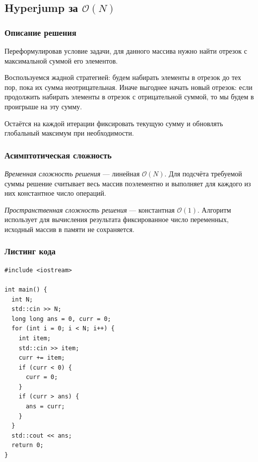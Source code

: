 \subsection{Hyperjump за \( \mathcal{O}(N) \)}

\subsubsection{Описание решения}

Переформулировав условие задачи, для данного массива нужно найти отрезок с максимальной суммой его элементов.

Воспользуемся жадной стратегией: будем набирать элементы в отрезок до тех пор, пока их сумма неотрицательная. Иначе выгоднее начать новый отрезок: если продолжить набирать элементы в отрезок с отрицательной суммой, то мы будем в проигрыше на эту сумму.

Остаётся на каждой итерации фиксировать текущую сумму и обновлять глобальный максимум при необходимости.

\subsubsection{Асимптотическая сложность}

\textit{Временная сложность решения} --- линейная \( \mathcal{O}(N) \). Для подсчёта требуемой суммы решение считывает весь массив поэлементно и выполняет для каждого из них константное число операций.

\textit{Пространственная сложность решения} --- константная \( \mathcal{O}(1) \). Алгоритм использует для вычисления результата фиксированное число переменных, исходный массив в памяти не сохраняется.

\subsubsection{Листинг кода}

\begin{lstlisting}
#include <iostream>

int main() {
  int N;
  std::cin >> N;
  long long ans = 0, curr = 0;
  for (int i = 0; i < N; i++) {
    int item;
    std::cin >> item;
    curr += item;
    if (curr < 0) {
      curr = 0;
    }
    if (curr > ans) {
      ans = curr;
    }
  }
  std::cout << ans;
  return 0;
}
\end{lstlisting}